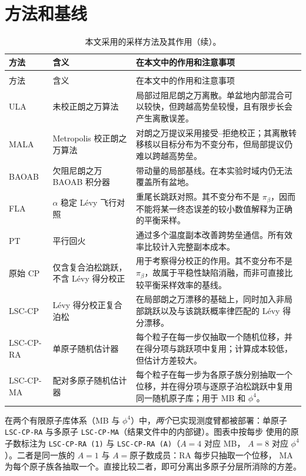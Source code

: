 \documentclass[11pt,a4paper]{article}
\renewcommand{\textsc}[1]{\textsf{\MakeUppercase{#1}}}
\begin{document}
\section{方法和基线}

\begin{longtable}{L{2.5cm}L{4.0cm}L{7.8cm}}
\caption{本文采用的采样方法及其作用。}\label{tab:zh-methods}\\
\toprule
方法 & 含义 & 在本文中的作用和注意事项 \\
\midrule
\endfirsthead
\caption[]{本文采用的采样方法及其作用（续）。}\\
\toprule
方法 & 含义 & 在本文中的作用和注意事项 \\
\midrule
\endhead
\textsc{ula} &
未校正朗之万算法 &
局部过阻尼朗之万离散。单盆地内部混合可以较快，但跨越高势垒较慢，且有限步长会产生离散误差。 \\
\textsc{mala} &
Metropolis 校正朗之万算法 &
对朗之万提议采用接受--拒绝校正；其离散转移核以目标分布为不变分布，但局部提议仍难以跨越高势垒。 \\
\textsc{baoab} &
欠阻尼朗之万 BAOAB 积分器 &
带动量的局部基线。在本实验时域内仍无法覆盖所有盆地。 \\
\textsc{fla} &
$\alpha$ 稳定 Lévy 飞行对照 &
重尾长跳跃对照。其不变分布不是 $\pi_\beta$，因而不能将某一终态误差的较小数值解释为正确的平衡采样。 \\
\textsc{pt} &
平行回火 &
通过多个温度副本改善跨势垒通信。所有效率比较计入完整副本成本。 \\
原始 \textsc{cp} &
仅含复合泊松跳跃，不含 Lévy 得分校正 &
用于考察得分校正的作用。其不变分布不是 $\pi_\beta$，故属于平稳性缺陷消融，而非可直接比较平衡采样效率的基线。 \\
\textsc{lsc-cp} &
Lévy 得分校正复合泊松 &
在局部朗之万漂移的基础上，同时加入非局部跳跃以及与该跳跃概率律匹配的 Lévy 得分漂移。 \\
\textsc{lsc-cp-ra} &
单原子随机估计器 &
每个粒子在每一步仅抽取一个随机位移，并在得分项与跳跃项中复用；计算成本较低，但估计方差较大。 \\
\textsc{lsc-cp-ma} &
配对多原子随机估计器 &
每个粒子在每一步为各原子族分别抽取一个位移，并在得分项与逐原子泊松跳跃中复用同一随机原子库；用于 MB 和 $\phi^4$。 \\
\bottomrule
\end{longtable}

\noindent
在两个有限原子库体系（MB 与 $\phi^4$）中，\emph{两个}已实现测度臂都被部署：单原子
\texttt{LSC-CP-RA} 与多原子 \texttt{LSC-CP-MA}（结果文件中的内部键）。图表中按每步
使用的原子数标注为 \texttt{LSC-CP-RA (1)} 与 \texttt{LSC-CP-RA (A)}（$A=4$ 对应 MB，
$A=8$ 对应 $\phi^4$）。二者是同一族的 $A=1$ 与 $A=$原子数成员：RA 每步只抽取一个位移，
MA 为每个原子族各抽取一个。直接比较二者，即可分离出多原子分层所消除的方差。
\end{document}
